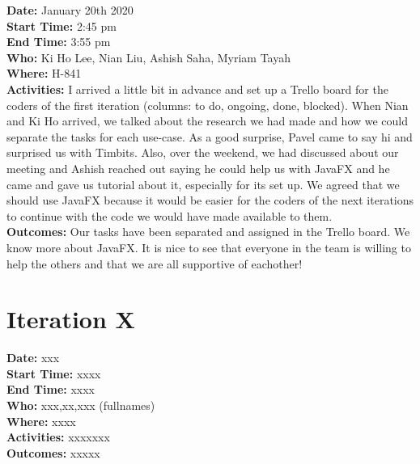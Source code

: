 \documentclass[12pt]{article}
\begin{document}
{\bf Date:} January 20th 2020\\
{\bf Start Time:} 2:45 pm\\
{\bf End Time:} 3:55 pm \\
{\bf Who:} Ki Ho Lee, Nian Liu, Ashish Saha, Myriam Tayah\\
{\bf Where:} H-841 \\
{\bf Activities:} I arrived a little bit in advance and set up a Trello board for the coders of the first iteration (columns: to do, ongoing, done, blocked). When Nian and Ki Ho arrived, we talked about the research we had made and how we could separate the tasks for each use-case. As a good surprise, Pavel came to say hi and surprised us with Timbits. Also, over the weekend, we had discussed about our meeting and Ashish reached out saying he could help us with JavaFX and he came and gave us tutorial about it, especially for its set up. We agreed that we should use JavaFX because it would be easier for the coders of the next iterations to continue with the code we would have made available to them. \\
{\bf Outcomes:} Our tasks have been separated and assigned in the Trello board. We know more about JavaFX. It is nice to see that everyone in the team is willing to help the others and that we are all supportive of eachother!\\

\section{Iteration X}

{\bf Date:} xxx\\
{\bf Start Time:} xxxx\\
{\bf End Time:} xxxx \\
{\bf Who:} xxx,xx,xxx (fullnames)\\
{\bf Where:} xxxx \\
{\bf Activities:} xxxxxxx\\
{\bf Outcomes:} xxxxx\\


\end{document}
